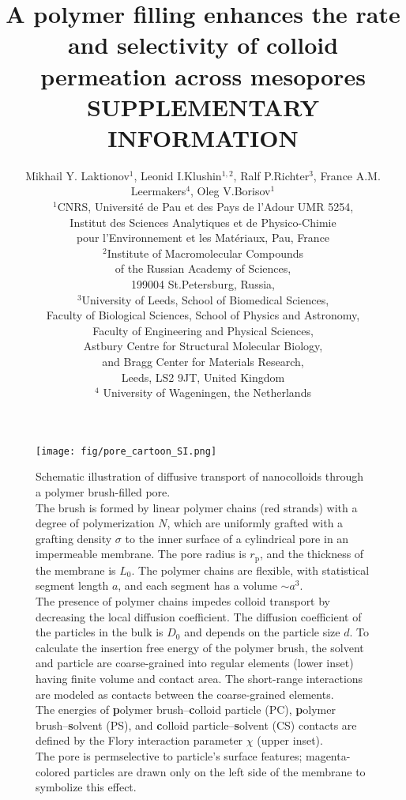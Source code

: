 \documentclass[10pt, a4paper]{article}
\title{A polymer filling enhances the rate and selectivity of colloid permeation across mesopores\\
        SUPPLEMENTARY INFORMATION}
\author{Mikhail Y. Laktionov$^1$, Leonid I.Klushin$^{1,2}$, Ralf P.Richter$^3$, France A.M. Leermakers$^4$, Oleg V.Borisov$^1$\\
$^{1}$CNRS, Universit\'e de Pau et des Pays de l'Adour UMR 5254,\\
Institut des Sciences Analytiques et de Physico-Chimie\\
pour l'Environnement et les Mat\'eriaux, Pau, France \\
$^{2}$Institute of Macromolecular Compounds \\
of the Russian Academy of Sciences, \\
199004 St.Petersburg, Russia,\\
$^{3}$University of Leeds, School of Biomedical Sciences, \\
Faculty of Biological Sciences, 
School of Physics and Astronomy, \\
Faculty of Engineering and Physical Sciences,\\  
Astbury Centre for Structural Molecular Biology,\\ 
and Bragg Center for Materials Research,\\ 
Leeds, LS2 9JT, United Kingdom\\
$^{4}$ University of Wageningen, the Netherlands}
\date{}
\begin{document}
\maketitle

\pagebreak

\begin{figure*}[htp!]
    \centering
    \texttt{[image: fig/pore\_cartoon\_SI.png]}
    \caption{
        Schematic illustration of diffusive transport of nanocolloids through a polymer brush-filled pore.
        \\
        The brush is formed by linear polymer chains (red strands) with a degree of polymerization $N$, which are uniformly grafted with a grafting density $\sigma$ to the inner surface of a cylindrical pore in an impermeable membrane.
        The pore radius is $r_{\text{p}}$, and the thickness of the membrane is $L_{0}$.
        The polymer chains are flexible, with statistical segment length $a$, and each segment has a volume $\sim a^3$.
        \\
        The presence of polymer chains impedes colloid transport by decreasing the local diffusion coefficient.
        The diffusion coefficient of the particles in the bulk is $D_0$ and depends on the particle size $d$.
        To calculate the insertion free energy of the polymer brush, the solvent and particle are coarse-grained into regular elements (lower inset) having finite volume and contact area.
        The short-range interactions are modeled as contacts between the coarse-grained elements.
        \\
        The energies of 
        \textbf{p}olymer brush–\textbf{c}olloid particle (PC), 
        \textbf{p}olymer brush–\textbf{s}olvent (PS),  
        and \textbf{c}olloid particle–\textbf{s}olvent (CS) contacts are defined by the Flory interaction parameter $\chi$ (upper inset).
        \\
        The pore is permselective to particle's surface features; magenta-colored particles are drawn only on the left side of the membrane to symbolize this effect.
    }
        \label{fig:colloid_transport_SI}
\end{figure*}

\end{document}
